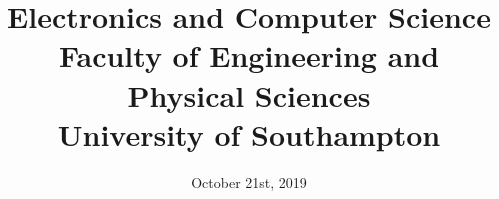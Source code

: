 \documentclass{src/ecsgdp}
\begin{document}
\frontmatter
\title      {Electronics and Computer Science\\Faculty of Engineering and Physical Sciences\\University of Southampton}
\addresses  {\groupname\\\deptname\\\univname}
\date       {October 21st, 2019}
\subject    {Automatically Generated Cyber Security Compliance Engine}
\keywords   {}
\maketitle

\begin{abstract}

\end{abstract}

\tableofcontents
\listoffigures
\listoftables
\lstlistoflistings



\mainmatter














\backmatter



\appendix

\end{document}
